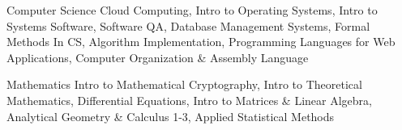 
\vspace{-1.5mm}
\begin{cvskills}

  \vspace{1mm}

  \cvskill
    {Computer Science} %
    {Cloud Computing, Intro to Operating Systems, Intro to Systems Software, Software QA,\newline \vspace{0.5mm} Database Management Systems, Formal Methods In CS, Algorithm Implementation,\newline \vspace{0.5mm} Programming Languages for Web Applications, Computer Organization \& Assembly Language} %

   \cvskill
    {Mathematics} %
	{Intro to Mathematical Cryptography, Intro to Theoretical Mathematics, Differential Equations,\newline \vspace{0.5mm} Intro to Matrices \& Linear Algebra, Analytical Geometry \& Calculus 1-3, Applied Statistical Methods} %


\end{cvskills}
\vspace{-0.5mm}